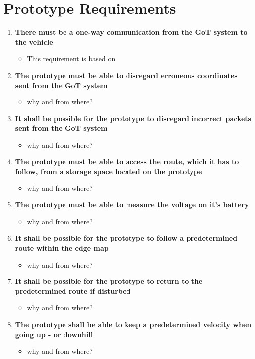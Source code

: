 \chapter{Prototype Requirements}

\begin{enumerate}
\item \textbf{There must be a one-way communication from the GoT system to the vehicle}
	\begin{itemize}
	\item[] This requirement is based on 
	\end{itemize}
\item \textbf{The prototype must be able to disregard erroneous coordinates sent from the GoT system}
	\begin{itemize}
	\item[] why and from where?
	\end{itemize}
\item \textbf{It shall be possible for the prototype to disregard incorrect packets sent from the GoT system}
	\begin{itemize}
	\item[] why and from where?
	\end{itemize}
\item \textbf{The prototype must be able to access the route, which it has to follow, from a storage space located on the prototype}
	\begin{itemize}
	\item[] why and from where?
	\end{itemize}
\item \textbf{The prototype must be able to measure the voltage on it's battery}
	\begin{itemize}
	\item[] why and from where?
	\end{itemize}
\item \textbf{It shall be possible for the prototype to follow a predetermined route within the edge map}
	\begin{itemize}
	\item[] why and from where?
	\end{itemize}
\item \textbf{It shall be possible for the prototype to return to the predetermined route if disturbed}
	\begin{itemize}
	\item[] why and from where?
	\end{itemize}
\item \textbf{The prototype shall be able to keep a predetermined velocity when going up - or downhill}
	\begin{itemize}
	\item[] why and from where?
	\end{itemize}
\end{enumerate}
